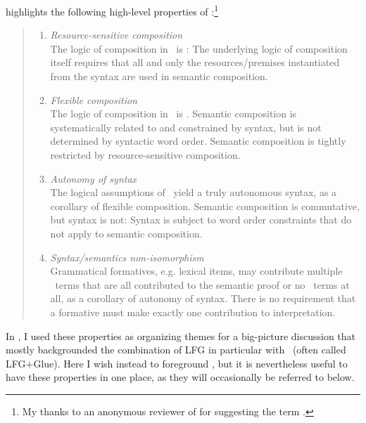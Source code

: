 \documentclass[output=paper,hidelinks]{langscibook}
\begin{document}
\citet[324]{asudeh22} highlights the following high-level properties
of \glues:\footnote{My thanks to an anonymous reviewer of
  \citet{asudeh22} for suggesting the term .}
%
\begin{quote}
\begin{enumerate}
\item \textit{Resource-sensitive composition}\\
  The logic of composition in \glue\ is : The
  underlying logic of composition itself requires that all
  and only the resources/pre\-mises instantiated from the syntax are used in
  semantic composition.

\item \textit{Flexible composition}\\
  The logic of composition in \glue\ is . Semantic
  composition is systematically related to and constrained by syntax,
  but is not determined by syntactic word order. Semantic composition is tightly
  restricted by resource-sensitive composition.    

\item \textit{Autonomy of syntax}\\
  The logical assumptions of \glue\ yield a truly autonomous syntax,
  as a corollary of flexible composition. Semantic composition is commutative, but
  syntax is not: Syntax is subject to word order
  constraints that do not apply to semantic composition.
  
\item \textit{Syntax/semantics non-isomorphism}\\
  Grammatical formatives, e.g. lexical items, may contribute multiple
  \glue\ terms that are all contributed to the semantic proof or no
  \glue\ terms at all, as a corollary of autonomy of syntax. There is no requirement
  that a formative must make exactly one contribution to
  interpretation.
\end{enumerate}
\end{quote}
%
In \citet{asudeh22}, I used these properties as organizing themes for
a big-picture discussion that mostly backgrounded the combination of
LFG in particular with \glue\ (often called LFG$+$Glue). Here I
wish instead to foreground \lfgglue, but it
is nevertheless useful to have these properties in one place, as they
will occasionally be referred to below.
\end{document}
